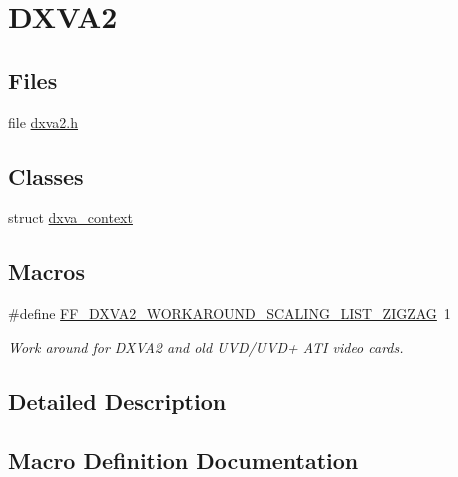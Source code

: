 \hypertarget{group__lavc__codec__hwaccel__dxva2}{}\section{D\+X\+V\+A2}
\label{group__lavc__codec__hwaccel__dxva2}
\subsection*{Files}
\begin{DoxyCompactItemize}
\item 
file \hyperlink{dxva2_8h}{dxva2.\+h}
\end{DoxyCompactItemize}
\subsection*{Classes}
\begin{DoxyCompactItemize}
\item 
struct \hyperlink{structdxva__context}{dxva\+\_\+context}
\end{DoxyCompactItemize}
\subsection*{Macros}
\begin{DoxyCompactItemize}
\item 
\#define \hyperlink{group__lavc__codec__hwaccel__dxva2_ga6d5f39a89d3e595eaf4198496c00599e}{F\+F\+\_\+\+D\+X\+V\+A2\+\_\+\+W\+O\+R\+K\+A\+R\+O\+U\+N\+D\+\_\+\+S\+C\+A\+L\+I\+N\+G\+\_\+\+L\+I\+S\+T\+\_\+\+Z\+I\+G\+Z\+AG}~1
\begin{DoxyCompactList}\small\item\em Work around for D\+X\+V\+A2 and old U\+V\+D/\+U\+V\+D+ A\+TI video cards. \end{DoxyCompactList}\end{DoxyCompactItemize}


\subsection{Detailed Description}


\subsection{Macro Definition Documentation}
